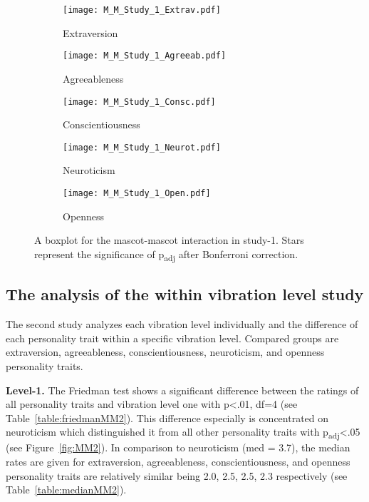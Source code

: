 \begin{figure}[hbt!]
    \centering
    \begin{subfigure}{.40\textwidth}
        \centering
        \texttt{[image: M\_M\_Study\_1\_Extrav.pdf]}
        \caption{Extraversion}
        \label{fig:sub1}
    \end{subfigure}\hfill%
    \begin{subfigure}{.40\textwidth}
        \centering
        \texttt{[image: M\_M\_Study\_1\_Agreeab.pdf]}
        \caption{Agreeableness}
        \label{fig:sub2}
    \end{subfigure}\hfill
    \begin{subfigure}{.40\textwidth}
        \centering
        \texttt{[image: M\_M\_Study\_1\_Consc.pdf]}
        \caption{Conscientiousness}
        \label{fig:sub1}
    \end{subfigure}\hfill%
    \begin{subfigure}{.40\textwidth}
        \centering
        \texttt{[image: M\_M\_Study\_1\_Neurot.pdf]}
        \caption{Neuroticism}
        \label{fig:sub1}
    \end{subfigure}\hfill%
    \begin{subfigure}{.40\textwidth}
        \centering
        \texttt{[image: M\_M\_Study\_1\_Open.pdf]}
        \caption{Openness}
        \label{fig:sub1}
    \end{subfigure}\hfill%
    \caption{A boxplot for the mascot-mascot interaction in study-1.
    Stars represent the significance of p\textsubscript{adj} after Bonferroni correction.}
    \label{fig:MM1}
\end{figure}
\subsection{The analysis of the within vibration level study}
\label{subsec:MMstudy2}
The second study analyzes each vibration level individually and the difference
of each personality trait within a specific vibration level.
Compared groups are extraversion, agreeableness, conscientiousness, neuroticism, and openness personality traits.

\par\textbf{Level-1.}
The Friedman test shows a significant difference between the ratings of all personality traits
and vibration level one with p<.01, df=4 (see Table~\ref{table:friedmanMM2}).
This difference especially is concentrated on neuroticism which distinguished it from all
other personality traits with p\textsubscript{adj}<.05 (see Figure~\ref{fig:MM2}).
In comparison to neuroticism (med = 3.7), the median rates are given for extraversion,
agreeableness, conscientiousness, and openness personality traits are relatively similar
being 2.0, 2.5, 2.5, 2.3 respectively (see Table~\ref{table:medianMM2}).

